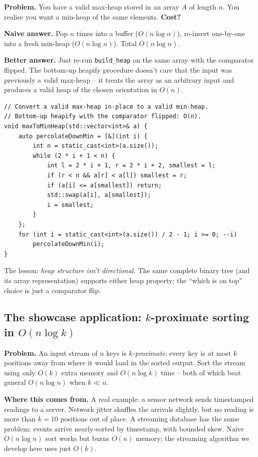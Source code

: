 \documentclass[11pt]{article}
\begin{document}
\begin{examplebox}
\textbf{Problem.} You have a valid max-heap stored in an array $A$ of
length $n$. You realise you want a min-heap of the same elements.
\textbf{Cost?}

\textbf{Naive answer.} Pop $n$ times into a buffer ($O(n \log n)$),
re-insert one-by-one into a fresh min-heap ($O(n \log n)$). Total
$O(n \log n)$.

\textbf{Better answer.} Just re-run \texttt{build\_heap} on the same
array with the comparator flipped. The bottom-up heapify procedure
doesn't care that the input was previously a valid max-heap -- it
treats the array as an arbitrary input and produces a valid heap of
the chosen orientation in $O(n)$.

\begin{lstlisting}
// Convert a valid max-heap in-place to a valid min-heap.
// Bottom-up heapify with the comparator flipped: O(n).
void maxToMinHeap(std::vector<int>& a) {
    auto percolateDownMin = [&](int i) {
        int n = static_cast<int>(a.size());
        while (2 * i + 1 < n) {
            int l = 2 * i + 1, r = 2 * i + 2, smallest = l;
            if (r < n && a[r] < a[l]) smallest = r;
            if (a[i] <= a[smallest]) return;
            std::swap(a[i], a[smallest]);
            i = smallest;
        }
    };
    for (int i = static_cast<int>(a.size()) / 2 - 1; i >= 0; --i)
        percolateDownMin(i);
}
\end{lstlisting}

The lesson: \emph{heap structure isn't directional.} The same complete
binary tree (and its array representation) supports either heap
property; the ``which is on top'' choice is just a comparator flip.
\end{examplebox}

\subsection*{The showcase application: $k$-proximate sorting in $O(n \log k)$}

\textbf{Problem.} An input stream of $n$ keys is \emph{$k$-proximate}:
every key is at most $k$ positions away from where it would land in
the sorted output. Sort the stream using only $O(k)$ extra memory and
$O(n \log k)$ time -- both of which beat general $O(n \log n)$ when
$k \ll n$.

\textbf{Where this comes from.} A real example: a sensor network sends
timestamped readings to a server. Network jitter shuffles the
arrivals slightly, but no reading is more than $k = 10$ positions
out of place. A streaming database has the same problem: events
arrive nearly-sorted by timestamp, with bounded skew. Naive
$O(n \log n)$ sort works but burns $O(n)$ memory; the streaming
algorithm we develop here uses just $O(k)$.
\end{document}
